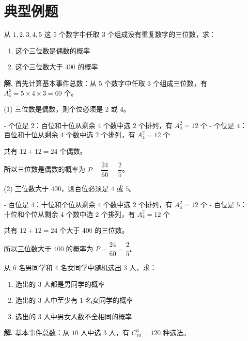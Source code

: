 \documentclass[11pt]{ctexrep}
\begin{document}
\section*{典型例题}

\begin{example}[分类与分步的综合应用]
    从 $1, 2, 3, 4, 5$ 这 $5$ 个数字中任取 $3$ 个组成没有重复数字的三位数，求：
    \begin{enumerate}
        \item 这个三位数是偶数的概率
        \item 这个三位数大于 $400$ 的概率
    \end{enumerate}
\end{example}

\textbf{解.} 首先计算基本事件总数：从 $5$ 个数字中任取 $3$ 个组成三位数，有 $A_5^3 = 5 \times 4 \times 3 = 60$ 个。

(1) 三位数是偶数，则个位必须是 $2$ 或 $4$。

- 个位是 $2$：百位和十位从剩余 $4$ 个数中选 $2$ 个排列，有 $A_4^2 = 12$ 个
- 个位是 $4$：百位和十位从剩余 $4$ 个数中选 $2$ 个排列，有 $A_4^2 = 12$ 个

共有 $12 + 12 = 24$ 个偶数。

所以三位数是偶数的概率为 $P = \dfrac{24}{60} = \dfrac{2}{5}$。

(2) 三位数大于 $400$，则百位必须是 $4$ 或 $5$。

- 百位是 $4$：十位和个位从剩余 $4$ 个数中选 $2$ 个排列，有 $A_4^2 = 12$ 个
- 百位是 $5$：十位和个位从剩余 $4$ 个数中选 $2$ 个排列，有 $A_4^2 = 12$ 个

共有 $12 + 12 = 24$ 个大于 $400$ 的三位数。

所以三位数大于 $400$ 的概率为 $P = \dfrac{24}{60} = \dfrac{2}{5}$。

\begin{example}[排列组合在概率中的应用]
    从 $6$ 名男同学和 $4$ 名女同学中随机选出 $3$ 人，求：
    \begin{enumerate}
        \item 选出的 $3$ 人都是男同学的概率
        \item 选出的 $3$ 人中至少有 $1$ 名女同学的概率
        \item 选出的 $3$ 人中男女人数不全相同的概率
    \end{enumerate}
\end{example}

\textbf{解.} 基本事件总数：从 $10$ 人中选 $3$ 人，有 $C_{10}^3 = 120$ 种选法。
\end{document}
